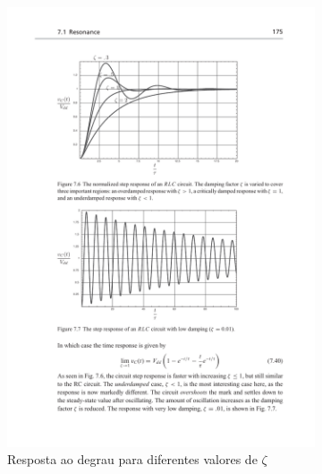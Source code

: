 \begin{frame}[shrink]

\begin{figure}[H]
    \centering
    \caption{$Q$ e $\zeta$ no tempo}
    \begin{subfigure}[H]{.49\textwidth}
        \centering
        \includegraphics[width=\textwidth]{fig/q-tempo-low.pdf}
        \caption{Resposta ao degrau para diferentes valores de $\zeta$}
    \end{subfigure}
    \hfil
    \begin{subfigure}[H]{.49\textwidth}
        \centering

\end{subfigure}
\end{figure}
\end{frame}

